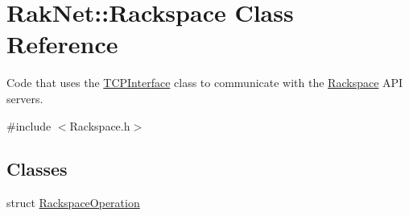 \hypertarget{class_rak_net_1_1_rackspace}{\section{Rak\-Net\-:\-:Rackspace Class Reference}
\label{class_rak_net_1_1_rackspace}
}


Code that uses the \hyperlink{class_rak_net_1_1_t_c_p_interface}{T\-C\-P\-Interface} class to communicate with the \hyperlink{class_rak_net_1_1_rackspace}{Rackspace} A\-P\-I servers.  




{\ttfamily \#include $<$Rackspace.\-h$>$}

\subsection*{Classes}
\begin{DoxyCompactItemize}
\item 
struct \hyperlink{struct_rak_net_1_1_rackspace_1_1_rackspace_operation}{Rackspace\-Operation}
\end{DoxyCompactItemize}
